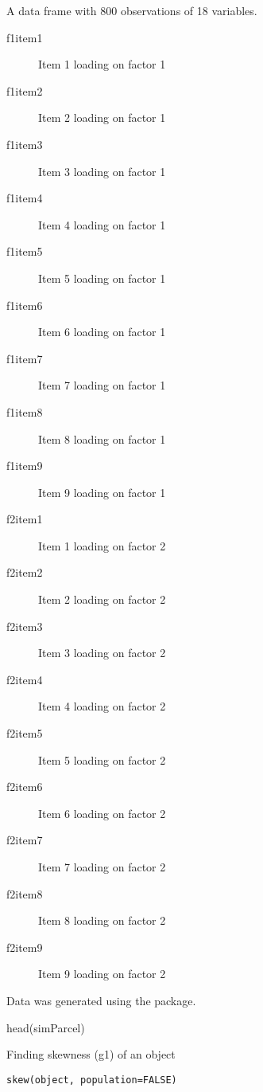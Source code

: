 \documentclass[a4paper]{book}
\begin{document}
\begin{Format}
A data frame with 800 observations of 18 variables.
\begin{description}

\item[f1item1] Item 1 loading on factor 1
\item[f1item2] Item 2 loading on factor 1
\item[f1item3] Item 3 loading on factor 1
\item[f1item4] Item 4 loading on factor 1
\item[f1item5] Item 5 loading on factor 1
\item[f1item6] Item 6 loading on factor 1
\item[f1item7] Item 7 loading on factor 1
\item[f1item8] Item 8 loading on factor 1
\item[f1item9] Item 9 loading on factor 1
\item[f2item1] Item 1 loading on factor 2
\item[f2item2] Item 2 loading on factor 2
\item[f2item3] Item 3 loading on factor 2
\item[f2item4] Item 4 loading on factor 2
\item[f2item5] Item 5 loading on factor 2
\item[f2item6] Item 6 loading on factor 2
\item[f2item7] Item 7 loading on factor 2
\item[f2item8] Item 8 loading on factor 2
\item[f2item9] Item 9 loading on factor 2

\end{description}

\end{Format}
%
\begin{Source}\relax
Data was generated using the  package.
\end{Source}
%
\begin{Examples}
\begin{ExampleCode}
head(simParcel)
\end{ExampleCode}
\end{Examples}
%
\begin{Description}\relax
Finding skewness (g1) of an object
\end{Description}
%
\begin{Usage}
\begin{verbatim}
skew(object, population=FALSE)
\end{verbatim}
\end{Usage}
\end{document}
